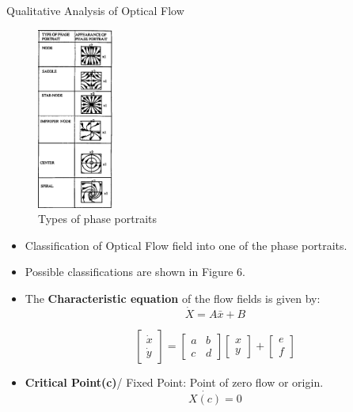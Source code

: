 \documentclass{beamer}
\begin{document}
\begin{frame}{Qualitative Analysis of Optical Flow}
\begin{minipage}{0.3\textwidth}
\begin{figure}
\label{wrap-fig:1}
\includegraphics[width=2.5cm]{images/ph_classification_2.png}
\caption{Types of phase portraits \cite{phase_port_paper}}
\end{figure}
\end{minipage}\hfill%
\begin{minipage}{0.68\textwidth}
\begin{itemize}
\item Classification of Optical Flow field into one of the phase portraits.
\item Possible classifications are shown in Figure 6.
\item The \textbf{Characteristic equation} of the flow fields is given by:
       	\begin{equation}
       		\dot{X} = A\bar{x} + B
       	\end{equation} 
       	
       	 \begin{equation}
    \begin{bmatrix}
  \dot{x} \\
  \dot{y}
  \end{bmatrix} =  \begin{bmatrix}
  a &b\\
  c &d
  \end{bmatrix} \begin{bmatrix}
  x \\
  y
  \end{bmatrix} + \begin{bmatrix}
  e \\
  f
  \end{bmatrix}
  \end{equation}
  
  \item \textbf{Critical Point(c)}/ Fixed Point: Point of zero flow or origin.
         	\begin{equation}
       		\dot{X(c)} = 0
       	\end{equation} 

\end{itemize}
\end{minipage}


\end{frame}
\end{document}
